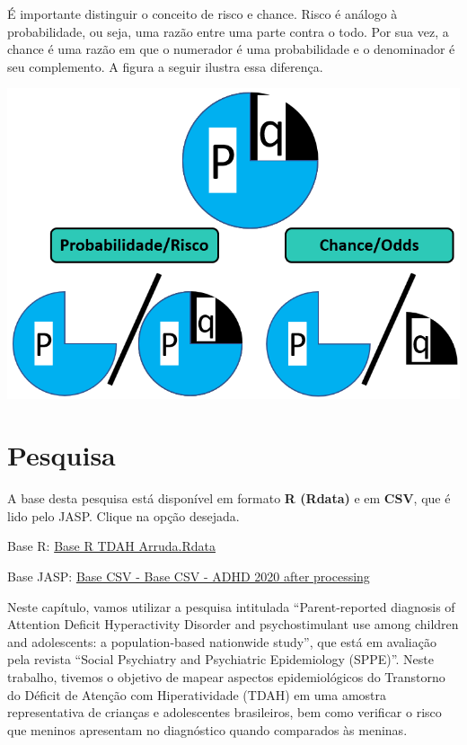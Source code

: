\documentclass[
]{book}
\begin{document}
É importante distinguir o conceito de risco e chance. Risco é análogo à probabilidade, ou seja, uma razão entre uma parte contra o todo. Por sua vez, a chance é uma razão em que o numerador é uma probabilidade e o denominador é seu complemento. A figura a seguir ilustra essa diferença.

\includegraphics{./img/cap_reg_log_odds.png}

\hypertarget{pesquisa-2}{%
\section{Pesquisa}\label{pesquisa-2}}

A base desta pesquisa está disponível em formato \textbf{R (Rdata)} e em \textbf{CSV}, que é lido pelo JASP. Clique na opção desejada.

Base R: \href{https://github.com/anovabr/mqt/raw/master/bases/Base\%20R\%20TDAH\%20Arruda.RData}{Base R TDAH Arruda.Rdata}

Base JASP: \href{https://github.com/anovabr/mqt/raw/master/bases/bases_csv_jasp.zip}{Base CSV - Base CSV - ADHD 2020 after processing}

Neste capítulo, vamos utilizar a pesquisa intitulada ``Parent-reported diagnosis of Attention Deficit Hyperactivity Disorder and psychostimulant use among children and adolescents: a population-based nationwide study'', que está em avaliação pela revista ``Social Psychiatry and Psychiatric Epidemiology (SPPE)''. Neste trabalho, tivemos o objetivo de mapear aspectos epidemiológicos do Transtorno do Déficit de Atenção com Hiperatividade (TDAH) em uma amostra representativa de crianças e adolescentes brasileiros, bem como verificar o risco que meninos apresentam no diagnóstico quando comparados às meninas.
\end{document}
